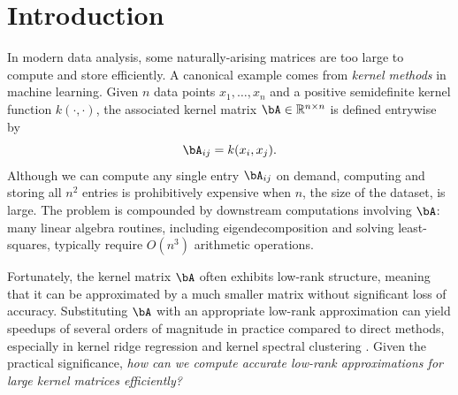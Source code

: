 
\section{Introduction}

In modern data analysis, some naturally-arising matrices are too large to compute and store efficiently. A canonical example comes from \emph{kernel methods} in machine learning. Given $n$ data points $x_1,\dots,x_n$ and a positive semidefinite kernel function $k(\cdot,\cdot)$, the associated kernel matrix $\bA \in \mathbb{R}^{n\times n}$ is defined entrywise by
\[
\bA_{ij} = k(x_i,x_j).
\]
Although we can compute any single entry $\bA_{ij}$ on demand, computing and storing all $n^2$ entries is prohibitively expensive when $n$, the size of the dataset, is large. The problem is compounded by downstream computations involving $\bA$: many linear algebra routines, including eigendecomposition and solving least-squares, typically require $O(n^3)$ arithmetic operations.

Fortunately, the kernel matrix $\bA$ often exhibits low-rank structure, meaning that it can be approximated by a much smaller matrix without significant loss of accuracy. Substituting $\bA$ with an appropriate low-rank approximation can yield speedups of several orders of magnitude in practice compared to direct methods, especially in kernel ridge regression and kernel spectral clustering \cite{chen_randomly_2025}. Given the practical significance, \textit{how can we compute accurate low-rank approximations for large kernel matrices efficiently?}





